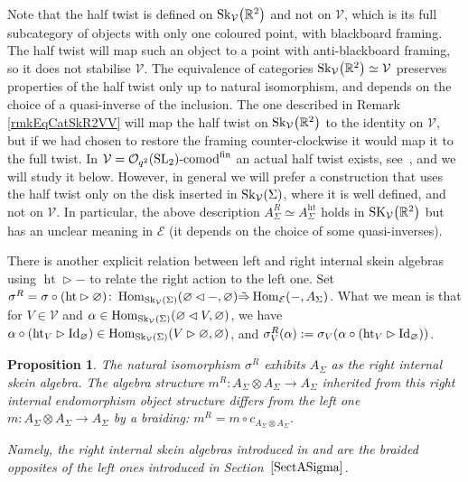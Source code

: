 \documentclass[pdftex]{sigma}%
\numberwithin{equation}{section}
\newtheorem{Proposition}[Theorem]{Proposition}
 { \theoremstyle{definition}
\newtheorem{Definition}[Theorem]{Definition}
\newtheorem{Note}[Theorem]{Note}
\newtheorem{Example}[Theorem]{Example}
\newtheorem{Remark}[Theorem]{Remark} }
\newcommand{\halft}{{\operatorname{ht}}}
\newcommand{\Hom}{\operatorname{Hom}}
\newcommand{\Oq}{\mathcal{O}_{q^2}({\rm SL}_2)}
\begin{document}
\begin{Remark}
Note that the half twist is defined on ${\rm Sk}_\mathcal{V}\big(\mathbb{R}^2\big)$ and not on $\mathcal{V}$, which is its full subcategory of objects with only one coloured point, with blackboard framing. The half twist will map such an object to a point with anti-blackboard framing, so it does not stabilise $\mathcal{V}$. The equivalence of categories ${\rm Sk}_\mathcal{V}\big(\mathbb{R}^2\big)\simeq \mathcal{V}$ preserves properties of the half twist only up to natural isomorphism, and depends on the choice of a quasi-inverse of the inclusion. The one described in Remark \ref{rmkEqCatSkR2VV} will map the half twist on ${\rm Sk}_\mathcal{V}\big(\mathbb{R}^2\big)$ to the identity on $\mathcal{V}$, but if we had chosen to restore the framing counter-clockwise it would map it to the full twist. In $\mathcal{V} = \Oq\text{-}{\rm comod}^{\rm fin}$ an actual half twist exists, see~\cite{SnyderTingley}, and we will study it below. However, in general we will prefer a construction that uses the half twist only on the disk inserted in ${\rm Sk}_\mathcal{V}(\Sigma)$, where it is well defined, and not on $\mathcal{V}$. In particular, the above description $A_\Sigma^R \simeq A_\Sigma^\halft$ holds in ${\rm SK}_\mathcal{V}\big(\mathbb{R}^2\big)$ but has an unclear meaning in $\mathcal{E}$ (it depends on the choice of some quasi-inverses).
\end{Remark}
\begin{Definition}
There is another explicit relation between left and right internal skein algebras using $\halft\rhd -$ to relate the right action to the left one. Set $\sigma^R =\sigma \circ (\halft \rhd \varnothing)\colon \Hom_{{\rm Sk}_\mathcal{V}(\Sigma)}(\varnothing\lhd-, \varnothing) \allowbreak\tilde{\Rightarrow} \Hom_{\mathcal{E}}(-, A_\Sigma)$. What we mean is that for $V \in \mathcal{V}$ and $\alpha \in \Hom_{{\rm Sk}_\mathcal{V}(\Sigma)}(\varnothing \lhd V, \varnothing)$, we have $\alpha \circ \allowbreak (\halft_V\rhd {\rm Id}_\varnothing)\in \Hom_{{\rm Sk}_\mathcal{V}(\Sigma)}(V\rhd \varnothing, \varnothing)$, and $\sigma^R_V(\alpha) := \sigma_V(\alpha \circ (\halft_V \rhd {\rm Id}_\varnothing))$.
\end{Definition}
\begin{Proposition}\label{propASigRightBrOpp}
The natural isomorphism $\sigma^R$ exhibits $A_\Sigma$ as the right internal skein algebra. The algebra structure $m^R\colon A_\Sigma \otimes A_\Sigma \to A_\Sigma$ inherited from this right internal endomorphism object structure differs from the left one $m\colon A_\Sigma \otimes A_\Sigma \to A_\Sigma$ by a braiding: $m^R = m \circ c_{A_\Sigma \otimes A_\Sigma}$.

Namely, the right internal skein algebras introduced in {\rm \cite{Gunningham}} and {\rm \cite{BBJ}} are the braided opposites of the left ones introduced in Section~$\ref{SectASigma}$.
\end{Proposition}
\end{document}
